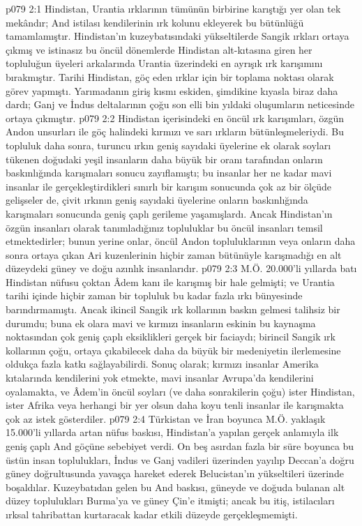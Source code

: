 \vs p079 2:1 Hindistan, Urantia ırklarının tümünün birbirine karıştığı yer olan tek mekândır; And istilası kendilerinin ırk kolunu ekleyerek bu bütünlüğü tamamlamıştır. Hindistan’ın kuzeybatısındaki yükseltilerde Sangik ırkları ortaya çıkmış ve istinasız bu öncül dönemlerde Hindistan alt\hyp{}kıtasına giren her topluluğun üyeleri arkalarında Urantia üzerindeki en ayrışık ırk karışımını bırakmıştır. Tarihi Hindistan, göç eden ırklar için bir toplama noktası olarak görev yapmıştı. Yarımadanın giriş kısmı eskiden, şimdikine kıyasla biraz daha dardı; Ganj ve İndus deltalarının çoğu son elli bin yıldaki oluşumların neticesinde ortaya çıkmıştır.
\vs p079 2:2 Hindistan içerisindeki en öncül ırk karışımları, özgün Andon unsurları ile göç halindeki kırmızı ve sarı ırkların bütünleşmeleriydi. Bu topluluk daha sonra, turuncu ırkın geniş sayıdaki üyelerine ek olarak soyları tükenen doğudaki yeşil insanların daha büyük bir oranı tarafından onların baskınlığında karışmaları sonucu zayıflamıştı; bu insanlar her ne kadar mavi insanlar ile gerçekleştirdikleri sınırlı bir karışım sonucunda çok az bir ölçüde gelişseler de, çivit ırkının geniş sayıdaki üyelerine onların baskınlığında karışmaları sonucunda geniş çaplı gerileme yaşamışlardı. Ancak Hindistan’ın özgün insanları olarak tanımladığınız topluluklar bu öncül insanları temsil etmektedirler; bunun yerine onlar, öncül Andon topluluklarının veya onların daha sonra ortaya çıkan Ari kuzenlerinin hiçbir zaman bütünüyle karışmadığı en alt düzeydeki güney ve doğu azınlık insanlarıdır.
\vs p079 2:3 M.Ö. 20.000’li yıllarda batı Hindistan nüfusu çoktan Âdem kanı ile karışmış bir hale gelmişti; ve Urantia tarihi içinde hiçbir zaman bir topluluk bu kadar fazla ırkı bünyesinde barındırmamıştı. Ancak ikincil Sangik ırk kollarının baskın gelmesi talihsiz bir durumdu; buna ek olara mavi ve kırmızı insanların eskinin bu kaynaşma noktasından çok geniş çaplı eksiklikleri gerçek bir faciaydı; birincil Sangik ırk kollarının çoğu, ortaya çıkabilecek daha da büyük bir medeniyetin ilerlemesine oldukça fazla katkı sağlayabilirdi. Sonuç olarak; kırmızı insanlar Amerika kıtalarında kendilerini yok etmekte, mavi insanlar Avrupa’da kendilerini oyalamakta, ve Âdem’in öncül soyları (ve daha sonrakilerin çoğu) ister Hindistan, ister Afrika veya herhangi bir yer olsun daha koyu tenli insanlar ile karışmakta çok az istek gösterdiler.
\vs p079 2:4 Türkistan ve İran boyunca M.Ö. yaklaşık 15.000’li yıllarda artan nüfus baskısı, Hindistan’a yapılan gerçek anlamıyla ilk geniş çaplı And göçüne sebebiyet verdi. On beş asırdan fazla bir süre boyunca bu üstün insan toplulukları, İndus ve Ganj vadileri üzerinden yayılıp Deccan’a doğru güney doğrultusunda yavaşça hareket ederek Belucistan’ın yükseltileri üzerinde boşaldılar. Kuzeybatıdan gelen bu And baskısı, güneyde ve doğuda bulanan alt düzey toplulukları Burma’ya ve güney Çin’e itmişti; ancak bu itiş, istilacıları ırksal tahribattan kurtaracak kadar etkili düzeyde gerçekleşmemişti.
